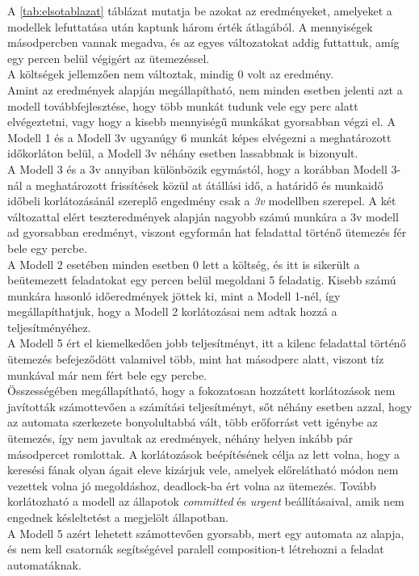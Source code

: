 \documentclass {report}
\begin{document}
   A \ref{tab:elsotablazat} táblázat mutatja be azokat az eredményeket, amelyeket a modellek lefuttatása után kaptunk három érték átlagából. A mennyiségek másodpercben vannak megadva, és az egyes változatokat addig futtattuk, amíg egy percen belül végigért az ütemezéssel.\\
   A költségek jellemzően nem változtak, mindig 0 volt az eredmény.\\
   Amint az eredmények alapján megállapítható, nem minden esetben jelenti azt a modell továbbfejlesztése, hogy több munkát tudunk vele egy perc alatt elvégeztetni, vagy hogy a kisebb mennyiségű munkákat gyorsabban végzi el. A Modell 1 és a Modell 3v ugyanúgy 6 munkát képes elvégezni a meghatározott időkorláton belül, a Modell 3v néhány esetben lassabbnak is bizonyult.\\
   A Modell 3 és a 3v annyiban különbözik egymástól, hogy a korábban Modell 3-nál a meghatározott frissítések közül at átállási idő, a határidő és munkaidő időbeli korlátozásánál szereplő engedmény csak a \emph{3v} modellben szerepel. A két változattal elért teszteredmények alapján nagyobb számú munkára a 3v modell ad gyorsabban eredményt, viszont egyformán hat feladattal történő ütemezés fér bele egy percbe.\\
   A Modell 2 esetében minden esetben 0 lett a költség, és itt is sikerült a beütemezett feladatokat egy percen belül megoldani 5 feladatig. Kisebb számú munkára hasonló időeredmények jöttek ki, mint a Modell 1-nél, így megállapíthatjuk, hogy a Modell 2 korlátozásai nem adtak hozzá a teljesítményéhez. \\
   A Modell 5 ért el kiemelkedően jobb teljesítményt, itt a kilenc feladattal történő ütemezés befejeződött valamivel több, mint hat másodperc alatt, viszont tíz munkával már nem fért bele egy percbe.\\
   Összességében megállapítható, hogy a fokozatosan hozzátett korlátozások nem javították számottevően a számítási teljesítményt, sőt néhány esetben azzal, hogy az automata szerkezete bonyolultabbá vált, több erőforrást vett igénybe az ütemezés, így nem javultak az eredmények, néhány helyen inkább pár másodpercet romlottak. A korlátozások beépítésének célja az lett volna, hogy a keresési fának olyan ágait eleve kizárjuk vele, amelyek előrelátható módon nem vezettek volna jó megoldáshoz, deadlock-ba ért volna az ütemezés. Tovább korlátozható a modell az állapotok \emph{committed} és \emph{urgent} beállításaival, amik nem engednek késleltetést a megjelölt állapotban.\\ 
   A Modell 5 azért lehetett számottevően gyorsabb, mert egy automata az alapja, és nem kell csatornák segítségével paralell composition-t létrehozni a feladat automatáknak. 
\end{document}
